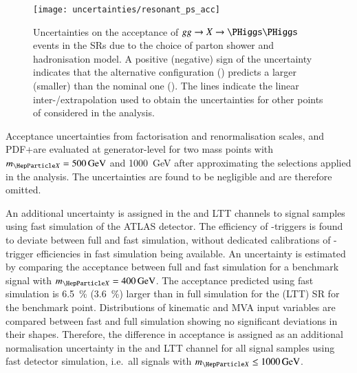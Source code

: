 
\begin{figure}[htbp]
  \centering

  \texttt{[image: uncertainties/resonant\_ps\_acc]}

  \caption{Uncertainties on the acceptance of $gg \to X \to \HH$ events in the
    SRs due to the choice of parton shower and hadronisation model. A positive
    (negative) sign of the uncertainty indicates that the alternative
    configuration (\PYTHIA) predicts a larger (smaller) \AccTimesEff than the
    nominal one (\HERWIG). The lines indicate the linear inter-/extrapolation
    used to obtain the uncertainties for other points of \mX considered in the
    analysis.}%
  \label{fig:resonant_partonshower}
\end{figure}

Acceptance uncertainties from factorisation and renormalisation scales, and
PDF+\alphas are evaluated at generator-level for two mass points with
$\mX = \SI{500}{\GeV}$ and \SI{1000}{\GeV} after approximating the selections
applied in the analysis. The uncertainties are found to be negligible and are
therefore omitted.

An additional uncertainty is assigned in the \hadhad and \lephad LTT channels to
signal samples using fast simulation of the ATLAS detector. The efficiency of
\tauhadvis-triggers is found to deviate between full and fast simulation,
without dedicated calibrations of \tauhadvis-trigger efficiencies in fast
simulation being available. An uncertainty is estimated by comparing the
acceptance between full and fast simulation for a benchmark signal with
$\mX = \SI{400}{\GeV}$. The acceptance predicted using fast simulation is
\SI{6.5}{\percent} (\SI{3.6}{\percent}) larger than in full simulation for the
\hadhad (\lephad LTT) SR for the benchmark point. Distributions of kinematic and
MVA input variables are compared between fast and full simulation showing no
significant deviations in their shapes. Therefore, the difference in acceptance
is assigned as an additional normalisation uncertainty in the \hadhad and
\lephad LTT channel for all signal samples using fast detector simulation, i.e.\
all signals with $\mX \leq \SI{1000}{\GeV}$.

